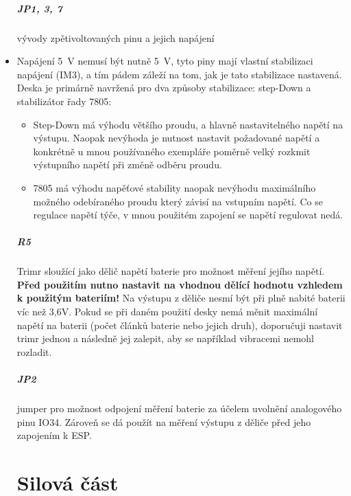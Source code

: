 \documentclass{template/socthesis}
\begin{document}
\begin{itemize}
	
	\paragraph*{JP1, 3, 7}
	vývody zpětivoltovaných pinu a jejich napájení
	\item \label{RB3202-5V} Napájení 5~V nemusí být nutně 5~V, tyto piny mají vlastní stabilizaci napájení (IM3), a tím pádem záleží na tom, jak je tato stabilizace nastavená. Deska je primárně navržená pro dva způsoby stabilizace: 
	step-Down a stabilizátor řady 7805:
	\begin{itemize}
		\item Step-Down má výhodu většího proudu, a hlavně nastavitelného napětí na výstupu. Naopak nevýhoda je nutnost nastavit požadované napětí a konkrétně u mnou používaného exempláře poměrně velký rozkmit výstupního napětí při změně odběru proudu.
		
		\item 7805 má výhodu napěťové stability naopak nevýhodu maximálního možného odebíraného proudu který závisí na vstupním napětí. Co se regulace napětí týče, v mnou použitém zapojení se napětí regulovat nedá.
	\end{itemize}
	

	
	\paragraph*{R5}
	Trimr sloužící jako dělič napětí baterie pro možnost měření jejího napětí. 
	\textbf{Před použitím nutno nastavit na vhodnou dělící hodnotu vzhledem k použitým bateriím!} Na výstupu z děliče nesmí být při plně nabité baterii víc než 3,6V. Pokud se při daném použití desky nemá měnit maximální napětí na baterii (počet článků baterie nebo jejich druh), doporučuji nastavit trimr jednou a následně jej zalepit, aby se například vibracemi nemohl rozladit.
	
	\paragraph*{JP2}
	jumper pro možnost odpojení měření baterie za účelem uvolnění analogového pinu IO34. Zároveň se dá použít na měření výstupu z děliče před jeho zapojením k ESP.
	
	\chapter{Silová část}\label{RB3202s}


\end{itemize}
\end{document}
